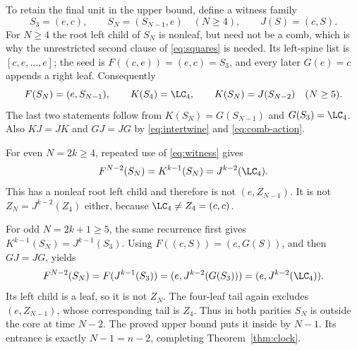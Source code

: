 To retain the final unit in the upper bound, define a witness family
\[
 S_3=(e,c),\qquad S_N=(S_{N-1},e)\quad(N\ge4),\qquad J(S)=(c,S).
\]
For \(N\ge4\) the root left child of \(S_N\) is nonleaf, but need not
be a comb, which is why the unrestricted second clause of
\eqref{eq:squares} is needed. Its left-spine list is
\([c,e,\ldots,e]\); the seed is \(F((c,e))=(e,c)=S_3\), and every
later \(G(e)=c\) appends a right leaf. Consequently
\begin{equation}\label{eq:witness}
 F(S_N)=(e,S_{N-1}),\qquad
 K(S_4)=\LC_4,\qquad K(S_N)=J(S_{N-2})\quad(N\ge5).
\end{equation}
The last two statements follow from \(K(S_N)=G(S_{N-1})\) and
\(G(S_3)=\LC_4\). Also \(KJ=JK\) and \(GJ=JG\) by
\eqref{eq:intertwine} and \eqref{eq:comb-action}.

For even \(N=2k\ge4\), repeated use of \eqref{eq:witness} gives
\[
 F^{N-2}(S_N)=K^{k-1}(S_N)=J^{k-2}(\LC_4).
\]
This has a nonleaf root left child and therefore is not \((e,Z_{N-1})\).
It is not \(Z_N=J^{k-2}(Z_4)\) either, because
\(\LC_4\ne Z_4=(c,c)\).

For odd \(N=2k+1\ge5\), the same recurrence first gives
\(K^{k-1}(S_N)=J^{k-1}(S_3)\).
Using \(F((c,S))=(e,G(S))\), and then \(GJ=JG\), yields
\[
 F^{N-2}(S_N)
   =F(J^{k-1}(S_3))
   =(e,J^{k-2}(G(S_3)))
   =(e,J^{k-2}(\LC_4)).
\]
Its left child is a leaf, so it is not \(Z_N\).
The four-leaf tail again excludes \((e,Z_{N-1})\), whose corresponding
tail is \(Z_4\). Thus in both parities \(S_N\) is outside the core at
time \(N-2\). The proved upper bound puts it inside by \(N-1\).
Its entrance is exactly \(N-1=n-2\), completing
Theorem~\ref{thm:clock}.
